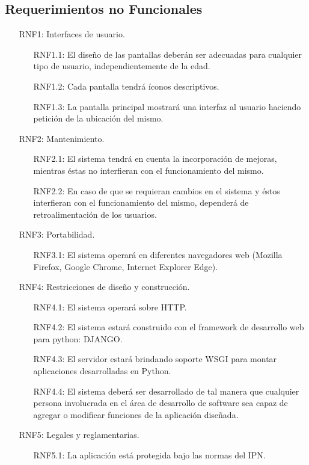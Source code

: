 %
%

\subsection{Requerimientos no Funcionales}

\begin{itemize}
	\item[RNF1:] Interfaces de usuario.
	\begin{itemize}
		\item[RNF1.1:] El diseño de las pantallas deberán ser adecuadas 
		para cualquier tipo de usuario, independientemente de la edad.
		\item[RNF1.2:] Cada pantalla tendrá íconos descriptivos.
		\item[RNF1.3:] La pantalla principal mostrará una interfaz al 
		usuario haciendo petición de la ubicación del mismo.
	\end{itemize}
	\item[RNF2:] Mantenimiento.
	\begin{itemize}
		\item[RNF2.1:] El sistema tendrá en cuenta la incorporación de 
		mejoras, mientras éstas no interfieran con el funcionamiento del 
		mismo.
		\item[RNF2.2:] En caso de que se requieran cambios en el sistema 
		y éstos interfieran con el funcionamiento del mismo, dependerá 
		de retroalimentación de los usuarios.
	\end{itemize}
	\item[RNF3:] Portabilidad.
	\begin{itemize}
		\item[RNF3.1:] El sistema operará en diferentes navegadores web 
		(Mozilla Firefox, Google Chrome, Internet Explorer Edge).
	\end{itemize}
	\item[RNF4:] Restricciones de diseño y construcción.
	\begin{itemize}
		\item[RNF4.1:] El sistema operará sobre HTTP.
		\item[RNF4.2:] El sistema estará construido con el framework de 
		desarrollo web para python: DJANGO.
		\item[RNF4.3:] El servidor estará brindando soporte WSGI para 
		montar aplicaciones desarrolladas en Python.
		\item[RNF4.4:] El sistema deberá ser desarrollado de tal manera 
		que cualquier persona involucrada en el área de desarrollo de 
		software sea capaz de agregar o modificar funciones de la 
		aplicación diseñada.
	\end{itemize}
	\item[RNF5:] Legales y reglamentarias.
	\begin{itemize}
		\item[RNF5.1:] La aplicación está protegida bajo las normas del 
		IPN.
	\end{itemize}
\end{itemize}
